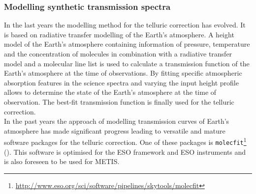 \subsubsection{Modelling synthetic transmission spectra}
In the last years the modelling method for the telluric correction has evolved. It is based on radiative transfer modelling of the Earth's atmosphere. A height model of the Earth's atmosphere containing information of pressure, temperature and the concentration of molecules in combination with a radiative transfer model and a molecular line list is used to calculate a transmission function of the Earth's atmosphere at the time of observations. By fitting specific atmospheric absorption features in the science spectra and varying the input height profile allows to determine the state of the Earth's atmosphere at the time of observation. The best-fit transmission function is finally used for the telluric correction.\\
In the past years the approach of modelling transmission curves of Earth's atmosphere has made significant progress leading to versatile and mature software packages for the telluric correction. One of these packages is \texttt{molecfit}\footnote{\url{http://www.eso.org/sci/software/pipelines/skytools/molecfit}} (\cite{mf1, mf2, molecfit}). This software is optimised for the ESO framework and ESO instruments and is also foreseen to be used for \ac{METIS}.\\

